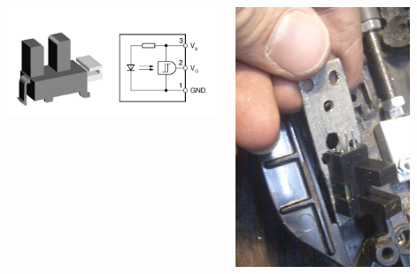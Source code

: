 \documentclass[pdf]{beamer}
\begin{document}
\begin{frame}
  \begin{columns}
      \begin{center}
      \includegraphics[width = 1.0\textwidth]{pics/raw/ls.png}
      \end{center}
      \begin{center}
      \includegraphics[width = 0.8\textwidth]{pics/raw/encoder_blech.png}
      \end{center}
  \end{columns}
\end{frame}
\end{document}
